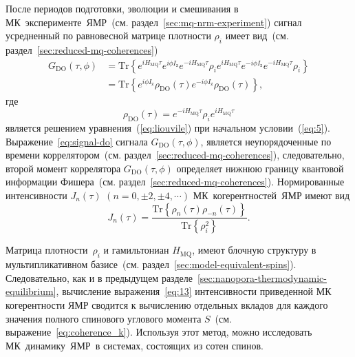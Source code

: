 После периодов подготовки, эволюции и смешивания в МК~эксперименте~ЯМР~(см. раздел~\ref{sec:mq-nrm-experiment})
сигнал усредненный по равновесной матрице плотности $\rho_i$
имеет вид~(см. раздел~\ref{sec:reduced-mq-coherences})
%
\begin{equation}\label{eq:signal-do}
  \begin{split}
    G_\mathrm{DO}(\tau,\phi)
    & = \mathrm{Tr}\left\{
      e^{i H_\mathrm{MQ} \tau} e^{i\phi I_\mathrm{z}} e^{-i H_\mathrm{MQ}\tau}
      \rho_i
      e^{i H_\mathrm{MQ} \tau} e^{-i \phi I_\mathrm{z}} e^{-i H_\mathrm{MQ} \tau}
      \rho_i
    \right\} \\
    & = \mathrm{Tr} \left\{
    e^{i \phi I_\mathrm{z}}
    \rho_\mathrm{DO}(\tau)
    e^{-i \phi I_\mathrm{z}}
    \rho_\mathrm{DO}(\tau)
    \right\},
  \end{split}
\end{equation}
%
где
%
\begin{equation}
  \label{eq:9}
  \rho_\mathrm{DO}(\tau)
  = e^{-i H_\mathrm{MQ} \tau }
  \rho_i
  e^{i H_\mathrm{MQ} \tau}
\end{equation}
%
является решением уравнения~(\ref{eq:liouvile}) при начальном условии~(\ref{eq:5}).
Выражение~\ref{eq:signal-do} сигнала  $G_\mathrm{DO}(\tau,\phi)$,
является неупорядоченные по времени коррелятором~(см. раздел~\ref{sec:reduced-mq-coherences}),
следовательно, второй момент коррелятора $G_\mathrm{DO}(\tau,\phi)$ определяет
нижнюю границу квантовой информации Фишера~(см. раздел~\ref{sec:reduced-mq-coherences}).
Нормированные интенсивности $J_{n}(\tau)$ $(n=0, \pm 2, \pm 4, \cdots)$ МК~когерентностей~ЯМР
имеют вид
%
\begin{equation}\label{eq:13}
  J_{n}(\tau) = \dfrac{\mathrm{Tr} \left\{
  \rho_{n}(\tau) \rho_{-n}(\tau)
  \right\}}
  {\mathrm{Tr} \left\{\rho^2_{i} \right\}}.
\end{equation}


Матрица плотности~$\rho_i$ и гамильтониан $H_\mathrm{MQ}$,
имеют блочную структуру в мультипликативном базисе~(см. раздел~\ref{sec:model-equivalent-spins}).
Следовательно, как и в предыдущем разделе~\ref{sec:nanopora-thermodynamic-equilibrium},
вычисление выражения~\ref{eq:13} интенсивности приведенной МК когерентности ЯМР сводится
к вычислению отдельных вкладов
для каждого значения полного спинового углового момента $S$~(см. выражение~\ref{eq:coherence_k}).
Используя этот метод, можно исследовать МК~динамику~ЯМР~в системах, состоящих из сотен спинов.


